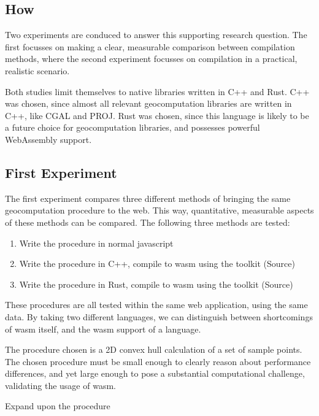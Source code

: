 \subsection*{How}

Two experiments are conduced to answer this supporting research question. 
The first focusses on making a clear, measurable comparison between compilation methods, where the second experiment focusses on compilation in a practical, realistic scenario. 

Both studies limit themselves to native libraries written in C++ and Rust. 
C++ was chosen, since almost all relevant geocomputation libraries are written in C++, like CGAL and PROJ. 
Rust was chosen, since this language is likely to be a future choice for geocomputation libraries, and possesses powerful WebAssembly support. 


\subsection{First Experiment}
The first experiment compares three different methods of bringing the same geocomputation procedure to the web. 
This way, quantitative, measurable aspects of these methods can be compared. 
The following three methods are tested:
\begin{enumerate}[-]
  \item Write the procedure in normal javascript
  \item Write the procedure in C++, compile to wasm using the  toolkit (Source)
  \item Write the procedure in Rust, compile to wasm using the  toolkit (Source)
\end{enumerate}
These procedures are all tested within the same web application, using the same data. 
By taking two different languages, we can distinguish between shortcomings of \ac{wasm} itself, and the \ac{wasm} support of a language.  

The procedure chosen is a 2D convex hull calculation of a set of sample points. 
The chosen procedure must be small enough to clearly reason about performance differences, and yet large enough to pose a substantial computational challenge, validating the usage of \ac{wasm}.

\begin{note}
  Expand upon the procedure
\end{note}

